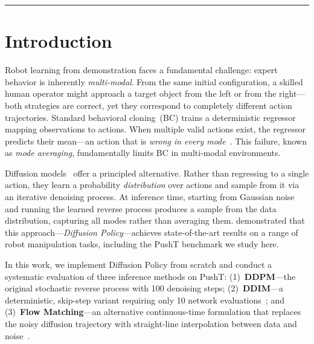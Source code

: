 \documentclass[10pt,letterpaper]{article}
\newcommand{\method}[1]{\textbf{#1}}
\begin{document}
\vspace{-2pt}
\noindent\rule{\linewidth}{1.2pt}
\vspace{4pt}

\section{Introduction}

Robot learning from demonstration faces a fundamental challenge: expert behavior
is inherently \textit{multi-modal}.
From the same initial configuration, a skilled human operator might approach a
target object from the left or from the right---both strategies are correct, yet
they correspond to completely different action trajectories.
Standard behavioral cloning~(BC) trains a deterministic regressor mapping
observations to actions.
When multiple valid actions exist, the regressor predicts their mean---an action
that is \emph{wrong in every mode}~\citep{pomerleau1989alvinn}.
This failure, known as \textit{mode averaging}, fundamentally limits BC in
multi-modal environments.

Diffusion models~\citep{ho2020ddpm} offer a principled alternative.
Rather than regressing to a single action, they learn a probability
\textit{distribution} over actions and sample from it via an iterative denoising
process.
At inference time, starting from Gaussian noise and running the learned reverse
process produces a sample from the data distribution, capturing all modes rather
than averaging them.
\citet{chi2023diffusion} demonstrated that this approach---\textit{Diffusion Policy}---achieves
state-of-the-art results on a range of robot manipulation tasks, including the
PushT benchmark we study here.

In this work, we implement Diffusion Policy from scratch and conduct a systematic
evaluation of three inference methods on PushT:
(1)~\method{DDPM}---the original stochastic reverse process with 100 denoising steps;
(2)~\method{DDIM}---a deterministic, skip-step variant requiring only 10 network
evaluations~\citep{song2021ddim};
and (3)~\method{Flow Matching}---an alternative continuous-time formulation that
replaces the noisy diffusion trajectory with straight-line interpolation between
data and noise~\citep{lipman2023flow,liu2023rectified}.
\end{document}
